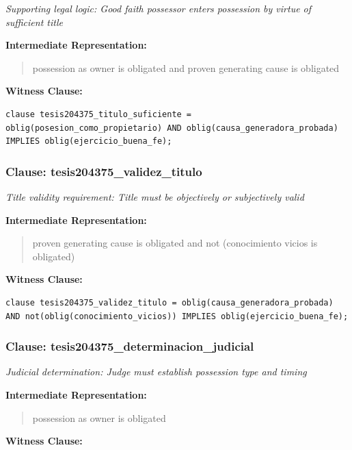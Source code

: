 \documentclass[11pt,a4paper]{article}
\begin{document}
\textit{Supporting legal logic: Good faith possessor enters possession by virtue of sufficient title}

\textbf{Intermediate Representation:}

\begin{quote}
possession as owner is obligated and proven generating cause is obligated
\end{quote}

\textbf{Witness Clause:}

\begin{lstlisting}[style=witnessstyle, language=Witness]
clause tesis204375_titulo_suficiente = oblig(posesion_como_propietario) AND oblig(causa_generadora_probada) IMPLIES oblig(ejercicio_buena_fe);
\end{lstlisting}

\subsubsection{Clause: tesis204375\_validez\_titulo}

\textit{Title validity requirement: Title must be objectively or subjectively valid}

\textbf{Intermediate Representation:}

\begin{quote}
proven generating cause is obligated and not (conocimiento vicios is obligated)
\end{quote}

\textbf{Witness Clause:}

\begin{lstlisting}[style=witnessstyle, language=Witness]
clause tesis204375_validez_titulo = oblig(causa_generadora_probada) AND not(oblig(conocimiento_vicios)) IMPLIES oblig(ejercicio_buena_fe);
\end{lstlisting}

\subsubsection{Clause: tesis204375\_determinacion\_judicial}

\textit{Judicial determination: Judge must establish possession type and timing}

\textbf{Intermediate Representation:}

\begin{quote}
possession as owner is obligated
\end{quote}

\textbf{Witness Clause:}
\end{document}
